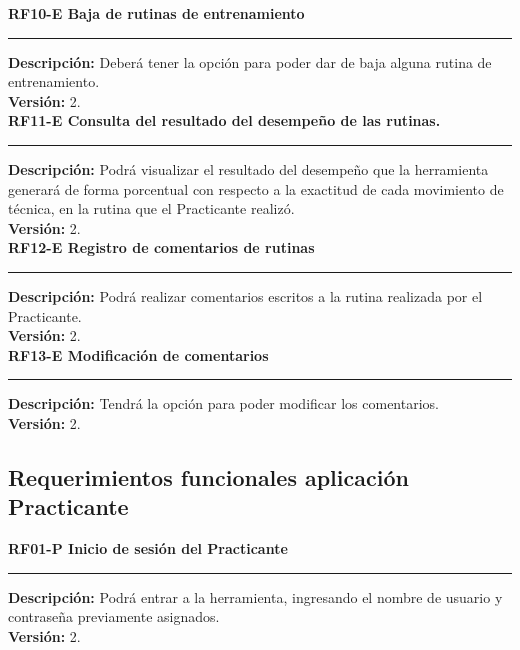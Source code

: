 \textbf{\textcolor[rgb]{0, 0, 0.545098}{RF10-E \hspace{2cm} Baja de rutinas de entrenamiento}}\\
\rule[3mm]{17cm}{0.1mm}
\label{rf:RF10-E}
\textbf{Descripción: } Deberá tener la opción para poder dar de baja alguna rutina de entrenamiento. \\
\textbf{Versión: } 2. \\

\textbf{\textcolor[rgb]{0, 0, 0.545098}{RF11-E \hspace{2cm} Consulta del resultado del desempeño de las rutinas.}}\\
\rule[3mm]{17cm}{0.1mm}
\label{rf:RF11-E}
\textbf{Descripción: } Podrá visualizar el resultado del desempeño que la herramienta generará de forma porcentual con respecto a la exactitud de cada movimiento de técnica, en la rutina que el Practicante realizó. \\
\textbf{Versión: } 2. \\

\textbf{\textcolor[rgb]{0, 0, 0.545098}{RF12-E \hspace{2cm} Registro de comentarios de rutinas}}\\
\rule[3mm]{17cm}{0.1mm}
\label{rf:RF12-E}
\textbf{Descripción: } Podrá realizar comentarios escritos a la rutina realizada por el Practicante. \\
\textbf{Versión: } 2. \\

\textbf{\textcolor[rgb]{0, 0, 0.545098}{RF13-E \hspace{2cm} Modificación de comentarios}}\\
\rule[3mm]{17cm}{0.1mm}
\label{rf:RF13-E}
\textbf{Descripción: } Tendrá la opción para poder modificar los comentarios. \\
\textbf{Versión: } 2. \\

\subsection{Requerimientos funcionales aplicación Practicante}

\textbf{\textcolor[rgb]{0, 0, 0.545098}{RF01-P \hspace{2cm} Inicio de sesión del Practicante}}\\
\rule[3mm]{17cm}{0.1mm}
\label{rf:RF01-P}
\textbf{Descripción: } Podrá entrar a la herramienta, ingresando el nombre de usuario y contraseña previamente asignados. \\
\textbf{Versión: } 2. \\


